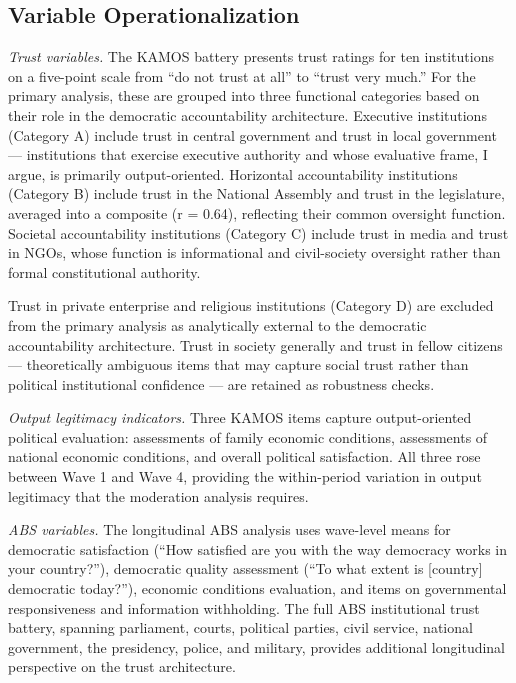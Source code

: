 \documentclass[
  12pt,
  letterpaper]{article}
\begin{document}
\subsection{Variable
Operationalization}\label{variable-operationalization}

\emph{Trust variables.} The KAMOS battery presents trust ratings for ten
institutions on a five-point scale from ``do not trust at all'' to
``trust very much.'' For the primary analysis, these are grouped into
three functional categories based on their role in the democratic
accountability architecture. Executive institutions (Category A) include
trust in central government and trust in local government ---
institutions that exercise executive authority and whose evaluative
frame, I argue, is primarily output-oriented. Horizontal accountability
institutions (Category B) include trust in the National Assembly and
trust in the legislature, averaged into a composite (r = 0.64),
reflecting their common oversight function. Societal accountability
institutions (Category C) include trust in media and trust in NGOs,
whose function is informational and civil-society oversight rather than
formal constitutional authority.

Trust in private enterprise and religious institutions (Category D) are
excluded from the primary analysis as analytically external to the
democratic accountability architecture. Trust in society generally and
trust in fellow citizens --- theoretically ambiguous items that may
capture social trust rather than political institutional confidence ---
are retained as robustness checks.

\emph{Output legitimacy indicators.} Three KAMOS items capture
output-oriented political evaluation: assessments of family economic
conditions, assessments of national economic conditions, and overall
political satisfaction. All three rose between Wave 1 and Wave 4,
providing the within-period variation in output legitimacy that the
moderation analysis requires.

\emph{ABS variables.} The longitudinal ABS analysis uses wave-level
means for democratic satisfaction (``How satisfied are you with the way
democracy works in your country?''), democratic quality assessment (``To
what extent is {[}country{]} democratic today?''), economic conditions
evaluation, and items on governmental responsiveness and information
withholding. The full ABS institutional trust battery, spanning
parliament, courts, political parties, civil service, national
government, the presidency, police, and military, provides additional
longitudinal perspective on the trust architecture.
\end{document}
